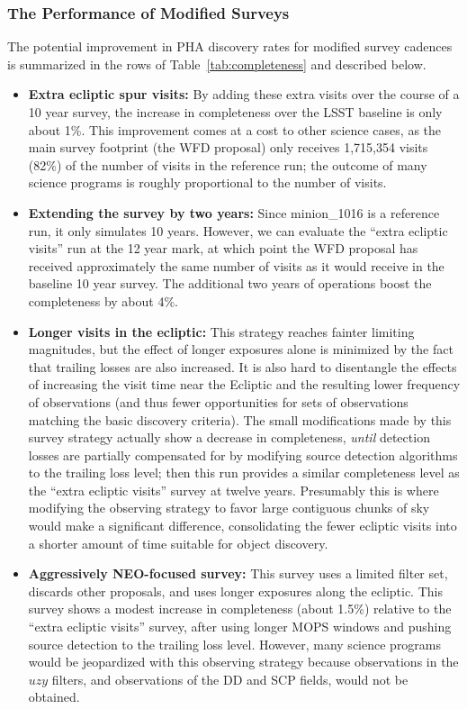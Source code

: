 \subsubsection{The Performance of Modified Surveys}

The potential improvement in PHA discovery rates for modified survey cadences is
summarized in the rows of Table~\ref{tab:completeness} and described below.

\begin{itemize}
\item \textbf{Extra ecliptic spur visits:} By adding these extra visits over the course of a 10 year survey, the increase in completeness over the LSST baseline is only about 1\%. This improvement comes at a cost to other science cases, as the main survey footprint (the WFD proposal) only receives 1,715,354 visits (82\%) of the number of visits in the reference run; the outcome of many science programs is roughly proportional to the number of visits.
\item \textbf{Extending the survey by two years:} Since minion\_1016 is a reference run, it only simulates 10 years.
However, we can evaluate the ``extra ecliptic visits'' run at the 12 year mark, at which point the WFD proposal has received approximately the same number of visits as it would receive in the baseline 10 year survey. The additional two years of operations boost the completeness
by about 4\%.
\item \textbf{Longer visits in the ecliptic:} This strategy reaches fainter limiting magnitudes, but the effect of longer exposures alone is minimized by the fact that trailing losses are also increased. It is also hard to disentangle the effects of increasing the visit time near the Ecliptic and the resulting lower frequency of observations (and thus fewer opportunities for sets of observations matching the basic discovery criteria). The small modifications made by this survey strategy actually show a decrease in completeness, {\it until} detection losses are partially compensated for by modifying source detection algorithms to the trailing loss level; then this run provides a similar completeness level as the ``extra ecliptic visits'' survey at twelve years. Presumably this is where modifying the observing strategy to favor large contiguous chunks of sky would make a significant difference, consolidating the fewer ecliptic visits into a shorter amount of time suitable for object discovery.
\item \textbf{Aggressively NEO-focused survey:} This survey uses a limited filter set, discards other proposals, and uses longer exposures along the ecliptic. This survey shows a modest increase in completeness (about 1.5\%) relative to the ``extra ecliptic visits'' survey, after using longer MOPS windows and pushing source detection to the trailing loss level.
However, many science programs would be jeopardized with this observing strategy because observations in the $uzy$ filters,
and observations of the DD and SCP fields, would not be obtained.
\end{itemize}

